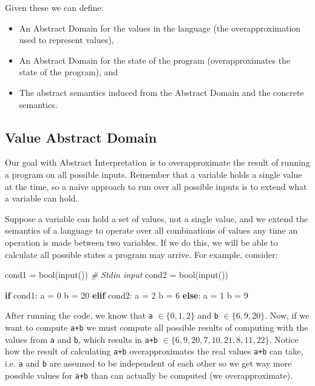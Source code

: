 \documentclass[
11pt, %
english, %
singlespacing, %
headsepline, %
]{MastersDoctoralThesis} %
\newenvironment{Shaded}{}{}
\newcommand{\BuiltInTok}[1]{#1}
\newcommand{\CommentTok}[1]{\textcolor[rgb]{0.38,0.63,0.69}{\textit{#1}}}
\newcommand{\ControlFlowTok}[1]{\textcolor[rgb]{0.00,0.44,0.13}{\textbf{#1}}}
\newcommand{\DecValTok}[1]{\textcolor[rgb]{0.25,0.63,0.44}{#1}}
\newcommand{\NormalTok}[1]{#1}
\newcommand{\OperatorTok}[1]{\textcolor[rgb]{0.40,0.40,0.40}{#1}}
\providecommand{\tightlist}{%
  \setlength{\itemsep}{0pt}\setlength{\parskip}{0pt}}
\begin{document}
Given these we can define:

\begin{itemize}
\tightlist
\item
  An Abstract Domain for the values in the language (the
  overapproximation used to represent values),
\item
  An Abstract Domain for the state of the program (overapproximates the
  state of the program), and
\item
  The abstract semantics induced from the Abstract Domain and the
  concrete semantics.
\end{itemize}

\hypertarget{value-abstract-domain}{%
\subsection{Value Abstract Domain}\label{value-abstract-domain}}

Our goal with Abstract Interpretation is to overapproximate the result
of running a program on all possible inputs. Remember that a variable
holds a single value at the time, so a naïve approach to run over all
possible inputs is to extend what a variable can hold.

Suppose a variable can hold a set of values, not a single value, and we
extend the semantics of a language to operate over all combinations of
values any time an operation is made between two variables. If we do
this, we will be able to calculate all possible states a program may
arrive. For example, consider:

\begin{Shaded}
\begin{Highlighting}[]
\NormalTok{cond1 }\OperatorTok{=} \BuiltInTok{bool}\NormalTok{(}\BuiltInTok{input}\NormalTok{())  }\CommentTok{# Stdin input}
\NormalTok{cond2 }\OperatorTok{=} \BuiltInTok{bool}\NormalTok{(}\BuiltInTok{input}\NormalTok{())}

\ControlFlowTok{if}\NormalTok{ cond1:}
\NormalTok{  a }\OperatorTok{=} \DecValTok{0}
\NormalTok{  b }\OperatorTok{=} \DecValTok{20}
\ControlFlowTok{elif}\NormalTok{ cond2:}
\NormalTok{  a }\OperatorTok{=} \DecValTok{2}
\NormalTok{  b }\OperatorTok{=} \DecValTok{6}
\ControlFlowTok{else}\NormalTok{:}
\NormalTok{  a }\OperatorTok{=} \DecValTok{1}
\NormalTok{  b }\OperatorTok{=} \DecValTok{9}
\end{Highlighting}
\end{Shaded}

After running the code, we know that \texttt{a} \(\in \{0, 1, 2\}\) and
\texttt{b} \(\in \{6, 9, 20\}\). Now, if we want to compute \texttt{a+b}
we must compute all possible results of computing with the values from
\texttt{a} and \texttt{b}, which results in \texttt{a+b}
\(\in \{6, 9, 20, 7, 10, 21, 8, 11, 22\}\). Notice how the result of
calculating \texttt{a+b} overapproximates the real values \texttt{a+b}
can take, i.e. \texttt{a} and \texttt{b} are assumed to be independent
of each other so we get way more possible values for \texttt{a+b} than
can actually be computed (we overapproximate).
\end{document}
